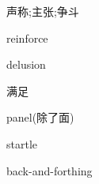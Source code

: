 \documentclass[a4paper, 12pt]{article}
\begin{document}
\begin{multicols}{2}
\begin{flushleft}
声称;主张;争斗 \ \ \ \ \underline{\hspace{3cm}}
\end{flushleft}

\begin{flushleft}
reinforce \ \ \ \ \underline{\hspace{3cm}}
\end{flushleft}
\end{multicols}

\begin{multicols}{2}
\begin{flushleft}
delusion \ \ \ \ \underline{\hspace{3cm}}
\end{flushleft}

\begin{flushleft}
满足 \ \ \ \ \underline{\hspace{3cm}}
\end{flushleft}
\end{multicols}

\begin{multicols}{2}
\begin{flushleft}
panel(除了面) \ \ \ \ \underline{\hspace{3cm}}
\end{flushleft}

\begin{flushleft}
startle \ \ \ \ \underline{\hspace{3cm}}
\end{flushleft}
\end{multicols}

\begin{multicols}{2}
\begin{flushleft}
back-and-forthing \ \ \ \ \underline{\hspace{3cm}}
\end{flushleft}

\begin{flushleft}
 \ \ \ \ \underline{\hspace{3cm}}
\end{flushleft}
\end{multicols}
\end{document}

